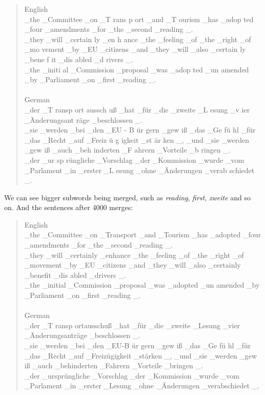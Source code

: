 \begin{quote}
	English\\
	\_the \_Committee \_on \_T rans p ort \_and \_T ourism \_has \_adop ted \_four \_amendments \_for \_the \_second \_reading \_.\\
	\_they \_will \_certain ly \_en h ance \_the \_feeling \_of \_the \_right \_of \_mo vement \_by \_EU \_citizens \_and \_they \_will \_also \_certain ly \_bene f it \_dis abled \_d rivers \_.\\
	\_the \_initi al \_Commission \_proposal \_was \_adop ted \_un amended \_by \_Parliament \_on \_first \_reading \_.\\\\
	German\\
	\_der \_T ransp ort aussch uß \_hat \_für \_die \_zweite \_L esung \_v ier \_Änderungsant räge \_beschlossen \_.\\
	\_sie \_werden \_bei \_den \_EU - B ür gern \_gew iß \_das \_Ge fü hl \_für \_das \_Recht \_auf \_Freiz ü g igkeit \_st är ken \_, \_und \_sie \_werden \_gew iß \_auch \_beh inderten \_F ahrern \_Vorteile \_b ringen \_.\\
	\_der \_ur sp rüngliche \_Vorschlag \_der \_Kommission \_wurde \_vom \_Parlament \_in \_erster \_L esung \_ohne \_Änderungen \_verab schiedet \_.
\end{quote}

We can see bigger subwords being merged, such as \emph{reading}, \emph{first}, \emph{zweite} and so on. And the sentences after 4000 merges:

\begin{quote}
	English\\
	\_the \_Committee \_on \_Transport \_and \_Tourism \_has \_adopted \_four \_amendments \_for \_the \_second \_reading \_.\\
	\_they \_will \_certainly \_enhance \_the \_feeling \_of \_the \_right \_of \_movement \_by \_EU \_citizens \_and \_they \_will \_also \_certainly \_benefit \_dis abled \_drivers \_.\\
	\_the \_initial \_Commission \_proposal \_was \_adopted \_un amended \_by \_Parliament \_on \_first \_reading \_.\\\\
	German\\
	\_der \_T ransp ortausschuß \_hat \_für \_die \_zweite \_Lesung \_vier \_Änderungsanträge \_beschlossen \_.\\
	\_sie \_werden \_bei \_den \_EU-B ür gern \_gew iß \_das \_Ge fü hl \_für \_das \_Recht \_auf \_Freizügigkeit \_stärken \_, \_und \_sie \_werden \_gew iß \_auch \_behinderten \_Fahrern \_Vorteile \_bringen \_.\\
	\_der \_ursprüngliche \_Vorschlag \_der \_Kommission \_wurde \_vom \_Parlament \_in \_erster \_Lesung \_ohne \_Änderungen \_verabschiedet \_.
\end{quote}

